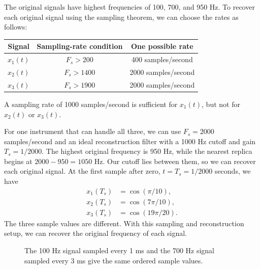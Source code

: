 The original signals have highest frequencies of 100, 700, and 950 Hz.
To recover each original signal using the sampling theorem, we can choose
the rates as follows:
\begin{center}
\begin{tabular}{c|c|c}
Signal & Sampling-rate condition & One possible rate \\
\hline
$x_1(t)$ & $F_s>200$ & 400 samples/second \\
$x_2(t)$ & $F_s>1400$ & 2000 samples/second \\
$x_3(t)$ & $F_s>1900$ & 2000 samples/second
\end{tabular}
\end{center}
A sampling rate of 1000 samples/second is sufficient for $x_1(t)$, but not for $x_2(t)$ or $x_3(t)$.

For one instrument that can handle all three, we can use
$F_s=2000$ samples/second and an ideal reconstruction filter with a
1000 Hz cutoff and gain $T_s=1/2000$. The highest original frequency is
950 Hz, while the nearest replica begins at $2000-950=1050$ Hz.
Our cutoff lies between them, so we can recover each original signal.
At the first sample after zero, $t=T_s=1/2000$ seconds, we have
\[
\begin{aligned}
x_1(T_s)&=\cos(\pi/10),\\
x_2(T_s)&=\cos(7\pi/10),\\
x_3(T_s)&=\cos(19\pi/20).
\end{aligned}
\]
The three sample values are different. With this sampling and reconstruction
setup, we can recover the original frequency of each signal.


\begin{figure}[htbp]
\centering
{}
\caption{The 100 Hz signal sampled every 1 ms and the 700 Hz signal sampled every 3 ms give the same ordered sample values.}
\end{figure}

